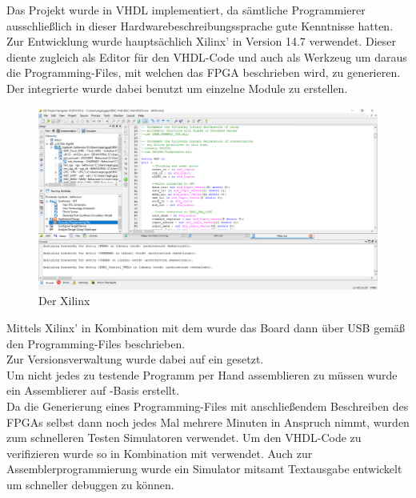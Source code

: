 Das Projekt wurde in VHDL implementiert, da s\"amtliche Programmierer ausschlie{\ss}lich in dieser Hardwarebeschreibungssprache gute Kenntnisse hatten.\\
Zur Entwicklung wurde haupts\"achlich Xilinx'  in Version 14.7 verwendet. Dieser diente zugleich als Editor f\"ur den VHDL-Code und auch als Werkzeug um daraus die Programming-Files, mit welchen das FPGA beschrieben wird, zu generieren. Der integrierte  wurde dabei benutzt um einzelne Module zu erstellen.\\
\begin{figure}[H]
	\centering
		\includegraphics[width=1.0\textwidth]{ISE.png}
	\caption{Der Xilinx }
	\label{fig:tool}
\end{figure}
Mittels Xilinx'  in Kombination mit dem  wurde das Board dann \"uber USB gem\"a{\ss} den Programming-Files beschrieben.\\
Zur Versionsverwaltung wurde dabei auf ein  gesetzt.\\ 
Um nicht jedes zu testende Programm per Hand assemblieren zu m\"ussen wurde ein Assemblierer auf -Basis erstellt.\\
Da die Generierung eines Programming-Files mit anschlie{\ss}endem Beschreiben des FPGAs selbst dann noch jedes Mal mehrere Minuten in Anspruch nimmt, wurden zum schnelleren Testen Simulatoren verwendet. Um den VHDL-Code zu verifizieren wurde so  in Kombination mit  verwendet. Auch zur Assemblerprogrammierung wurde ein Simulator mitsamt Textausgabe entwickelt um schneller debuggen zu k\"onnen.
